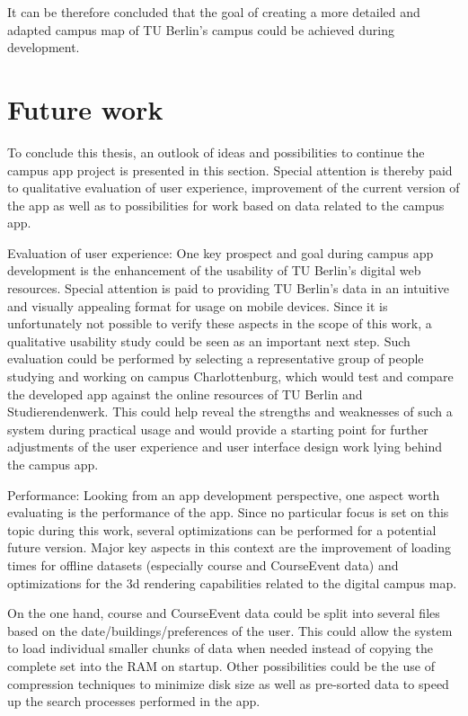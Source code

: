 It can be therefore concluded that the goal of creating a more detailed and adapted campus map of TU Berlin's campus could be achieved during development.

\section{Future work} \label{sec:future_work}
To conclude this thesis, an outlook of ideas and possibilities to continue the campus app project is presented in this section. Special attention is thereby paid to qualitative evaluation of user experience, improvement of the current version of the app as well as to possibilities for work based on data related to the campus app.

Evaluation of user experience: One key prospect and goal during campus app development is the enhancement of the usability of TU Berlin's digital web resources. Special attention is paid to providing TU Berlin's data in an intuitive and visually appealing format for usage on mobile devices. Since it is unfortunately not possible to verify these aspects in the scope of this work, a qualitative usability study could be seen as an important next step. Such evaluation could be performed by selecting a representative group of people studying and working on campus Charlottenburg, which would test and compare the developed app against the online resources of TU Berlin and Studierendenwerk. This could help reveal the strengths and weaknesses of such a system during practical usage and would provide a starting point for further adjustments of the user experience and user interface design work lying behind the campus app.

\newpage

Performance: Looking from an app development perspective, one aspect worth evaluating is the performance of the app. Since no particular focus is set on this topic during this work, several optimizations can be performed for a potential future version. Major key aspects in this context are the improvement of loading times for offline datasets (especially course and CourseEvent data) and optimizations for the 3d rendering capabilities related to the digital campus map.

On the one hand, course and CourseEvent data could be split into several files based on the date/buildings/preferences of the user. This could allow the system to load individual smaller chunks of data when needed instead of copying the complete set into the RAM on startup. Other possibilities could be the use of compression techniques to minimize disk size as well as pre-sorted data to speed up the search processes performed in the app.

